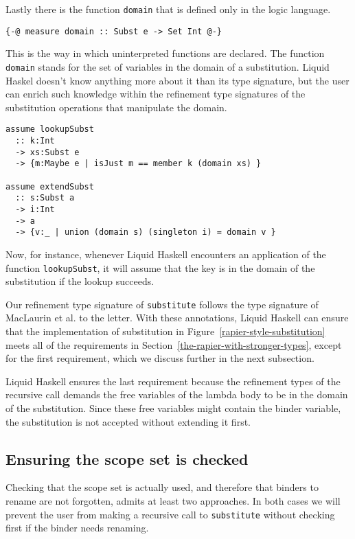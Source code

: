\documentclass[acmtog, anonymous]{acmart}
\newcommand{\tc}[1]{{\small\texttt{#1}}}
\begin{document}
Lastly there is the function \tc{domain} that is defined only in the logic
language.

\begin{verbatim}
{-@ measure domain :: Subst e -> Set Int @-}
\end{verbatim}

This is the way in which uninterpreted functions are declared. The function
\tc{domain} stands for the set of variables in the domain of a substitution.
Liquid Haskel doesn't know anything more about it than its type signature,
but the user can enrich such knowledge within the refinement type signatures
of the substitution operations that manipulate the domain.

\begin{verbatim}
assume lookupSubst
  :: k:Int
  -> xs:Subst e
  -> {m:Maybe e | isJust m == member k (domain xs) }

assume extendSubst
  :: s:Subst a
  -> i:Int
  -> a
  -> {v:_ | union (domain s) (singleton i) = domain v }
\end{verbatim}

Now, for instance, whenever Liquid Haskell encounters an application
of the function \tc{lookupSubst}, it will assume that the key is in the domain
of the substitution if the lookup succeeds.

Our refinement type signature of \tc{substitute} follows the type signature of
MacLaurin et al. to the letter. With these annotations, Liquid Haskell can ensure that the
implementation of substitution in Figure~\ref{rapier-style-substitution} meets
all of the requirements in Section~\ref{the-rapier-with-stronger-types}, except
for the first requirement, which we discuss further in the next subsection.

Liquid Haskell ensures the last requirement because the
refinement types of the recursive call demands the free variables of the lambda
body to be in the domain of the substitution. Since these free variables might
contain the binder variable, the substitution is not accepted without extending
it first.

\subsection{Ensuring the scope set is checked}
\label{ensuring-the-scope-set-is-checked}

Checking that the scope set is actually used, and therefore that binders to rename
are not forgotten, admits at least two approaches. In both cases we will prevent
the user from making a recursive call to \tc{substitute} without checking first
if the binder needs renaming.
\end{document}

